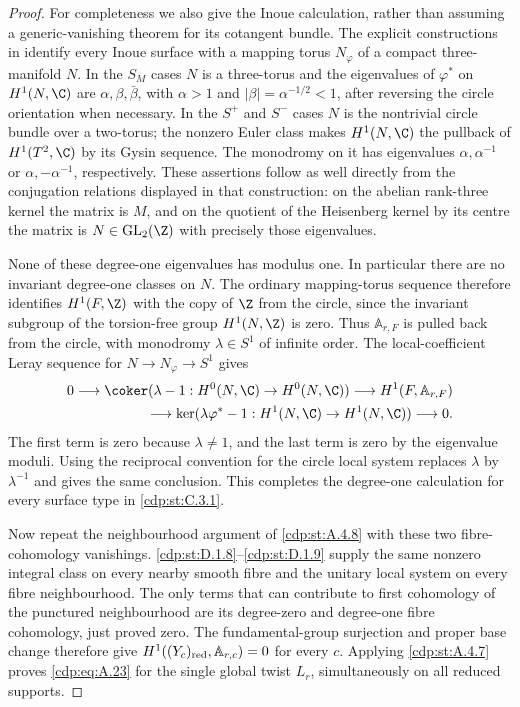 \begin{proof}
For completeness we also give the Inoue calculation, rather than assuming a generic-vanishing theorem for its cotangent bundle. The explicit constructions in \cite[\S2.1.2 and Proposition~2.3]{Albanese2020} identify every Inoue surface with a mapping torus $N_\varphi$ of a compact three-manifold $N$. In the $S_M$ cases $N$ is a three-torus and the eigenvalues of $\varphi^*$ on $H^1(N,\C)$ are $\alpha,\beta,\bar\beta$, with $\alpha>1$ and $|\beta|=\alpha^{-1/2}<1$, after reversing the circle orientation when necessary. In the $S^+$ and $S^-$ cases $N$ is the nontrivial circle bundle over a two-torus; the nonzero Euler class makes $H^1(N,\C)$ the pullback of $H^1(T^2,\C)$ by its Gysin sequence. The monodromy on it has eigenvalues $\alpha,\alpha^{-1}$ or $\alpha,-\alpha^{-1}$, respectively. These assertions follow as well directly from the conjugation relations displayed in that construction: on the abelian rank-three kernel the matrix is $M$, and on the quotient of the Heisenberg kernel by its centre the matrix is $N\in\mathrm{GL}_2(\Z)$ with precisely those eigenvalues.

None of these degree-one eigenvalues has modulus one. In particular there are no invariant degree-one classes on $N$. The ordinary mapping-torus sequence therefore identifies $H^1(F,\Z)$ with the copy of $\Z$ from the circle, since the invariant subgroup of the torsion-free group $H^1(N,\Z)$ is zero. Thus $\mathbb A_{r,F}$ is pulled back from the circle, with monodromy $\lambda\in S^1$ of infinite order. The local-coefficient Leray sequence for $N\to N_\varphi\to S^1$ gives
\[
\begin{split}
0\longrightarrow
 \coker(\lambda-1:H^0(N,\C)\to H^0(N,\C))
 \longrightarrow H^1(F,\mathbb A_{r,F})\\
 \longrightarrow
 \ker(\lambda\varphi^*-1:H^1(N,\C)\to H^1(N,\C))
 \longrightarrow0.
\end{split}
\]
The first term is zero because $\lambda\ne1$, and the last term is zero by the eigenvalue moduli. Using the reciprocal convention for the circle local system replaces $\lambda$ by $\lambda^{-1}$ and gives the same conclusion. This completes the degree-one calculation for every surface type in \ref{cdp:st:C.3.1}.

Now repeat the neighbourhood argument of \ref{cdp:st:A.4.8} with these two fibre-cohomology vanishings. \ref{cdp:st:D.1.8}--\ref{cdp:st:D.1.9} supply the same nonzero integral class on every nearby smooth fibre and the unitary local system on every fibre neighbourhood. The only terms that can contribute to first cohomology of the punctured neighbourhood are its degree-zero and degree-one fibre cohomology, just proved zero. The fundamental-group surjection and proper base change therefore give $H^1((Y_c)_{\rm red},\mathbb A_{r,c})=0$ for every $c$. Applying \ref{cdp:st:A.4.7} proves \eqref{cdp:eq:A.23} for the single global twist $L_r$, simultaneously on all reduced supports.


\end{proof}
